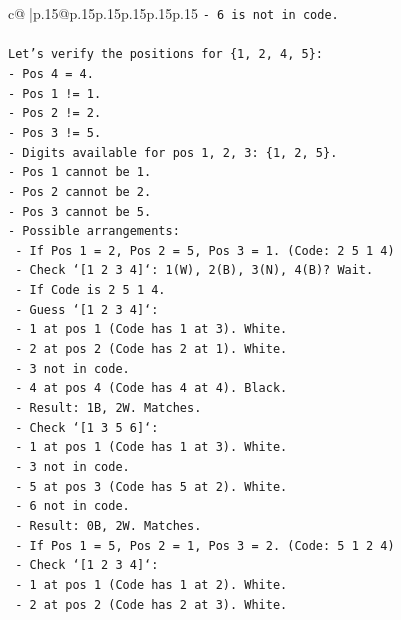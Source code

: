 \documentclass{article}
\begin{document}
{\begin{supertabular}{c@{$\;$}|p{.15\linewidth}@{}p{.15\linewidth}p{.15\linewidth}p{.15\linewidth}p{.15\linewidth}p{.15\linewidth}}
{{{\texttt{{-} 6 is not in code.} \\
\\ 
\texttt{Let's verify the positions for \{1, 2, 4, 5\}:} \\
\texttt{{-} Pos 4 = 4.} \\
\texttt{{-} Pos 1 != 1.} \\
\texttt{{-} Pos 2 != 2.} \\
\texttt{{-} Pos 3 != 5.} \\
\texttt{{-} Digits available for pos 1, 2, 3: \{1, 2, 5\}.} \\
\texttt{{-} Pos 1 cannot be 1.} \\
\texttt{{-} Pos 2 cannot be 2.} \\
\texttt{{-} Pos 3 cannot be 5.} \\
\texttt{{-} Possible arrangements:} \\
\texttt{  {-} If Pos 1 = 2, Pos 2 = 5, Pos 3 = 1. (Code: 2 5 1 4)} \\
\texttt{    {-} Check `{[}1 2 3 4{]}`: 1(W), 2(B), 3(N), 4(B)? Wait.} \\
\texttt{    {-} If Code is 2 5 1 4.} \\
\texttt{    {-} Guess `{[}1 2 3 4{]}`:} \\
\texttt{      {-} 1 at pos 1 (Code has 1 at 3). White.} \\
\texttt{      {-} 2 at pos 2 (Code has 2 at 1). White.} \\
\texttt{      {-} 3 not in code.} \\
\texttt{      {-} 4 at pos 4 (Code has 4 at 4). Black.} \\
\texttt{      {-} Result: 1B, 2W. Matches.} \\
\texttt{    {-} Check `{[}1 3 5 6{]}`:} \\
\texttt{      {-} 1 at pos 1 (Code has 1 at 3). White.} \\
\texttt{      {-} 3 not in code.} \\
\texttt{      {-} 5 at pos 3 (Code has 5 at 2). White.} \\
\texttt{      {-} 6 not in code.} \\
\texttt{      {-} Result: 0B, 2W. Matches.} \\
\texttt{  {-} If Pos 1 = 5, Pos 2 = 1, Pos 3 = 2. (Code: 5 1 2 4)} \\
\texttt{    {-} Check `{[}1 2 3 4{]}`:} \\
\texttt{      {-} 1 at pos 1 (Code has 1 at 2). White.} \\
\texttt{      {-} 2 at pos 2 (Code has 2 at 3). White.} \\
}}}
\end{supertabular}}
\end{document}
